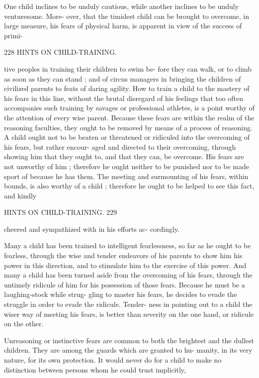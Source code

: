 \documentclass[
]{book}
\begin{document}
One child inclines to be unduly cautious, while another inclines to be unduly venturesome. More- over, that the timidest child can be brought to overcome, in large measure, his fears of physical harm, is apparent in view of the success of primi-

228 HINTS ON CHILD-TRAINING.

tive peoples in training their children to swim be- fore they can walk, or to climb as soon as they can stand ; and of circus managers in bringing the children of civilized parents to feats of daring agility. How to train a child to the mastery of his fears in this line, without the brutal disregard of his feelings that too often accompanies such training by savages or professional athletes, is a point worthy of the attention of every wise parent. Because these fears are within the realm of the reasoning faculties, they ought to be removed by means of a process of reasoning. A child ought not to be beaten or threatened or ridiculed into the overcoming of his fears, but rather encour- aged and directed to their overcoming, through showing him that they ought to, and that they can, be overcome. His fears are not unworthy of him ; therefore he ought neither to be punished nor to be made sport of because he has them. The meeting and surmounting of his fears, within bounds, is also worthy of a child ; therefore he ought to be helped to see this fact, and kindly

HINTS ON CHILD-TRAINING. 229

cheered and sympathized with in his efforts ac- cordingly.

Many a child has been trained to intelligent fearlessness, so far as he ought to be fearless, through the wise and tender endeavors of his parents to show him his power in this direction, and to stimulate him to the exercise of this power. And many a child has been turned aside from the overcoming of his fears, through the untimely ridicule of him for his possession of those fears. Because he must be a laughing-stock while strug- gling to master his fears, he decides to evade the struggle in order to evade the ridicule. Tender- ness in pointing out to a child the wiser way of meeting his fears, is better than severity on the one hand, or ridicule on the other.

Unreasoning or instinctive fears are common to both the brightest and the dullest children. They are among the guards which are granted to hu- manity, in its very nature, for its own protection. It would never do for a child to make no distinction between persons whom he could trust implicitly,
\end{document}
